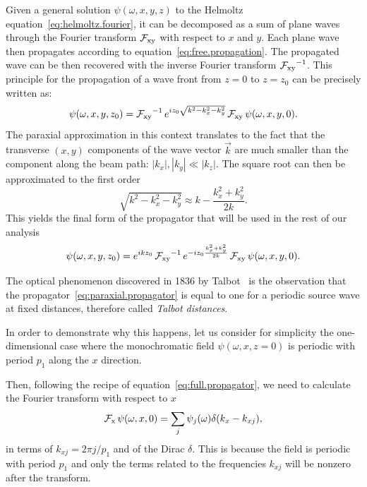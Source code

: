 Given a general solution $\psi(\omega, x, y, z)$ to the Helmoltz
equation~\eqref{eq:helmoltz.fourier}, it can be decomposed as a sum of plane
waves through the Fourier transform $\operatorname{\mathcal{F}_{xy}}$ with respect to $x$ and $y$. Each
plane wave then propagates according to
equation~\eqref{eq:free.propagation}. The propagated wave can be then
recovered with the inverse Fourier transform $\operatorname{\mathcal{F}_{xy}}^{-1}$.
This principle for the propagation of a wave front from $z=0$ to $z=z_0$ can
be precisely written as:
\begin{equation}
    \psi(\omega, x, y, z_0) = \operatorname{\mathcal{F}_{xy}}^{-1}e^{i z_0 \sqrt{k^2 - k_x^2 -
    k_y^2}}\operatorname{\mathcal{F}_{xy}}    \psi(\omega, x, y, 0).
    \label{eq:full.propagator}
\end{equation}
The paraxial approximation in this context translates to the fact that the
transverse $(x, y)$ components of the wave vector $\vec{k}$ are much smaller than the
component along the beam path: $|k_x|, |k_y| \ll |k_z|$. The square root can
then be approximated to the first order
\begin{equation}
    \sqrt{k^2 - k_x^2 - k_y^2} \approx k - \frac{k_x^2 + k_y^2}{2k}.
    \label{eq:square.root.approximation}
\end{equation}
This yields the final form of the propagator that will be used in the rest
of our analysis
\begin{equation}
    \psi(\omega, x, y, z_0) = e^{i k z_0}\operatorname{\mathcal{F}_{xy}}^{-1}e^{-i z_0\frac{k_x^2 +
    k_y^2}{2k}}\operatorname{\mathcal{F}_{xy}}\psi(\omega, x, y, 0). \label{eq:paraxial.propagator}
\end{equation}

The optical phenomenon discovered in 1836 by Talbot~\parencite{Talbot1836} is the observation that
the propagator~\eqref{eq:paraxial.propagator} is equal to one for a periodic
source wave at fixed distances, therefore called \emph{Talbot distances}.

In order to demonstrate why this happens, let us consider for simplicity the one-dimensional case where the
monochromatic field $\psi(\omega, x, z=0)$ is periodic with period $p_1$
along the $x$ direction. 

Then, following the recipe of equation~\eqref{eq:full.propagator}, we need
to calculate the Fourier transform with respect to $x$
\begin{equation*}
    \operatorname{\mathcal{F}_{x}}\psi(\omega, x, 0) = \sum_j \psi_j(\omega)\delta(k_x -
    k_{xj}),
\end{equation*}
in terms of $k_{xj} = 2\pi j/ p_1$ and of the Dirac $\delta$. This is
because the field is periodic with period $p_1$ and only the terms related
to the frequencies $k_{xj}$ will be nonzero after the transform.

